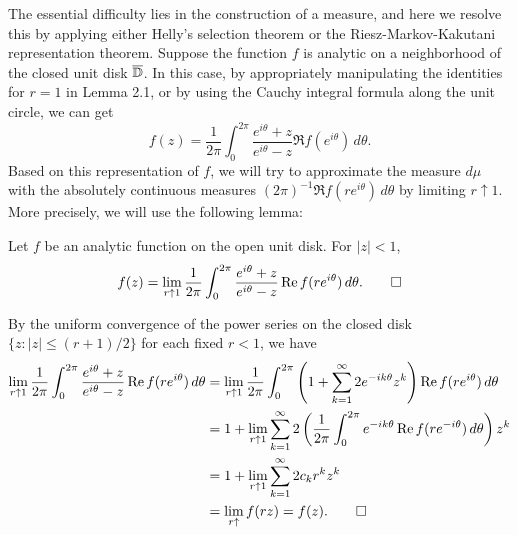 \documentclass[a4paper]{article}
\begin{document}
The essential difficulty lies in the construction of a measure, and here we resolve this by applying either Helly's selection theorem or the Riesz-Markov-Kakutani representation theorem.
Suppose the function $f$ is analytic on a neighborhood of the closed unit disk $\bar\D$.
In this case, by appropriately manipulating the identities for $r=1$ in Lemma 2.1, or by using the Cauchy integral formula along the unit circle, we can get
\[f(z)=\frac1{2\pi}\int_0^{2\pi}\frac{e^{i\theta}+z}{e^{i\theta}-z}\Re f(e^{i\theta})\,d\theta.\]
Based on this representation of $f$, we will try to approximate the measure $d\mu$ with the absolutely continuous measures $(2\pi)^{-1}\Re f(re^{i\theta})\,d\theta$ by limiting $r\uparrow1$.
More precisely, we will use the following lemma:
\begin{lem}
Let $f$ be an analytic function on the open unit disk.
For $|z|<1$,
\[f(z)=\lim_{r\uparrow1}\frac1{2\pi}\int_0^{2\pi}\frac{e^{i\theta}+z}{e^{i\theta}-z}\Re f(re^{i\theta})\,d\theta.\qedhere\]
\end{lem}
\begin{pf}
By the uniform convergence of the power series on the closed disk $\{z:|z|\le(r+1)/2\}$ for each fixed $r<1$, we have
\begin{align*}
\lim_{r\uparrow1}\frac1{2\pi}\int_0^{2\pi}\frac{e^{i\theta}+z}{e^{i\theta}-z}\Re f(re^{i\theta})\,d\theta
&=\lim_{r\uparrow1}\frac1{2\pi}\int_0^{2\pi}\left(1+\sum_{k=1}^\infty2e^{-ik\theta}z^k\right)\Re f(re^{i\theta})\,d\theta\\
&=1+\lim_{r\uparrow1}\sum_{k=1}^\infty2\left(\frac1{2\pi}\int_0^{2\pi}e^{-ik\theta}\Re f(re^{-i\theta})\,d\theta\right)z^k\\
&=1+\lim_{r\uparrow1}\sum_{k=1}^\infty2c_kr^kz^k\\
&=\lim_{r\uparrow}f(rz)=f(z).\qedhere
\end{align*}
\end{pf}
\end{document}
